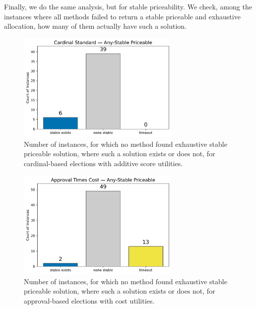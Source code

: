 Finally, we do the same analysis, but for stable priceability. We check, among the instances where all methods failed to return a stable priceable and exhaustive allocation, how many of them actually have such a solution.
\begin{figure}[H]         
  \centering              
  \includegraphics[width=0.7\textwidth]{figures/plots/cardinal-standard/cardinal_standard_any_stable_exhaustive.png}
  \caption{Number of instances, for which no method found exhaustive stable priceable solution, where such a solution exists or does not, for cardinal-based elections with additive score utilities.}
  \label{fig:myplot}
\end{figure}
\begin{figure}[H]         
  \centering              
  \includegraphics[width=0.7\textwidth]{figures/plots/approval-times-cost/approval_times_cost_any_stable_exhaustive.png}
  \caption{Number of instances, for which no method found exhaustive stable priceable solution, where such a solution exists or does not, for approval-based elections with cost utilities.}
  \label{fig:myplot}
\end{figure}
